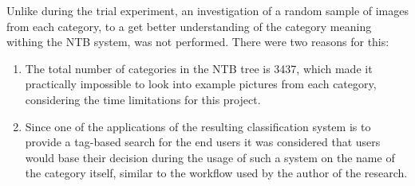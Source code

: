     
    Unlike during the trial experiment, an investigation of a random sample of images from each category, to a get better understanding of the category meaning withing the NTB system, was not performed. There were two reasons for this:
    
    \begin{enumerate}
        \item The total number of categories in the NTB tree is 3437, which made it practically impossible to look into example pictures from each category, considering the time limitations for this project. 
        \item Since one of the applications of the resulting classification system is to provide a tag-based search for the end users it was considered that users would base their decision during the usage of such a system on the name of the category itself, similar to the workflow used by the author of the research.
    \end{enumerate}
    
